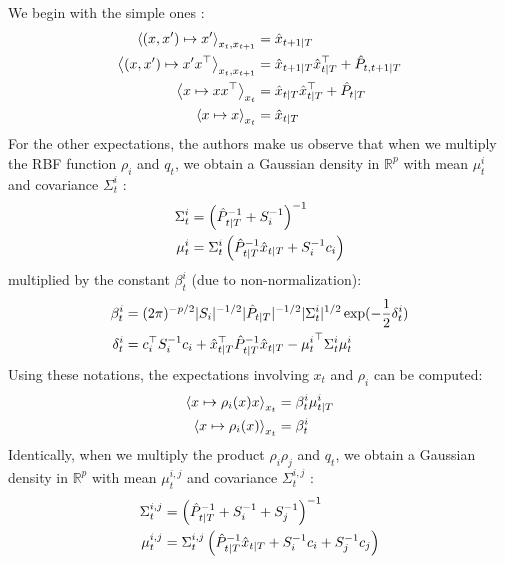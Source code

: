 We begin with the simple ones :
\begin{align*}
  \left< (x,x') \mapsto x'\right>_{x_t,x_{t+1}} &= \hat{x}_{t+1 \mathbin{\vert} T}\\
  \left< (x,x') \mapsto x'x^{\top}\right>_{x_t,x_{t+1}} &= \hat{x}_{t+1 \mathbin{\vert} T} \hat{x}_{t \mathbin{\vert} T}^{\top} + \hat{P}_{t,t+1 \mathbin{\vert} T}\\
  \left< x \mapsto xx^{\top}\right>_{x_t} &= \hat{x}_{t \mathbin{\vert} T} \hat{x}_{t \mathbin{\vert} T}^{\top} + \hat{P}_{t \mathbin{\vert} T}\\
  \left< x \mapsto x\right>_{x_t} &= \hat{x}_{t \mathbin{\vert} T}\\
\end{align*}
For the other expectations, the authors make us observe that when we multiply the RBF function $\rho_i$ and $q_t$, we obtain a Gaussian density in $\mathbb{R}^p$ with mean $\mu^i_t$ and covariance $\Sigma^i_t$ :
\begin{align*}
  \Sigma^i_t &= \left( \hat{P}_{t \mathbin{\vert} T}^{-1} + S_i^{-1} \right)^{-1}\\
  \mu^i_t &= \Sigma^i_t \left( \hat{P}_{t \mathbin{\vert} T}^{-1} \hat{x}_{t \mathbin{\vert} T} + S_i^{-1}c_i \right)\\
\end{align*}
multiplied by the constant $\beta^i_t$ (due to non-normalization):
\begin{align*}
  \beta^i_t &= (2\pi)^{-p/2} |S_i|^{-1/2} |\hat{P}_{t|T}|^{-1/2} |\Sigma^i_t|^{1/2} \exp(-\frac{1}{2} \delta^i_t)\\
  \delta^i_t &= c_i^{\top} S_i^{-1} c_i + \hat{x}_{t \mathbin{\vert} T}^{\top} \hat{P}_{t \mathbin{\vert} T}^{-1} \hat{x}_{t \mathbin{\vert} T} - {\mu^i_t}^{\top} \Sigma^i_t \mu^i_t\\
\end{align*}
Using these notations, the expectations involving $x_t$ and $\rho_i$ can be computed:
\begin{align*}
  \left< x \mapsto \rho_i(x) x \right>_{x_t} &= \beta^i_t \mu^i_{t \mathbin{\vert} T}\\
  \left< x \mapsto \rho_i(x) \right>_{x_t} &= \beta^i_t\\
\end{align*}
Identically, when we multiply the product $\rho_i \rho_j$ and $q_t$, we obtain a Gaussian density in $\mathbb{R}^p$ with mean $\mu^{i,j}_t$ and covariance $\Sigma^{i,j}_t$ :
\begin{align*}
  \Sigma^{i,j}_t &= \left( \hat{P}_{t \mathbin{\vert} T}^{-1} + S_i^{-1} + S_j^{-1} \right)^{-1}\\
  \mu^{i,j}_t &= \Sigma^{i,j}_t \left( \hat{P}_{t \mathbin{\vert} T}^{-1} \hat{x}_{t \mathbin{\vert} T} + S_i^{-1}c_i + S_j^{-1}c_j \right)\\
\end{align*}
